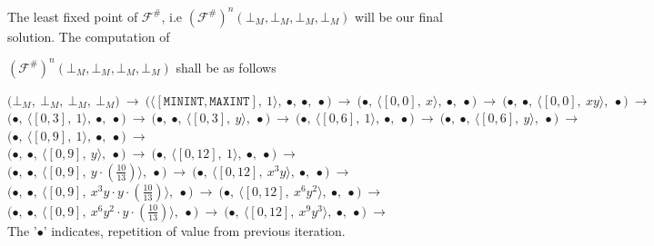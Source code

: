 \documentclass[final,3p, review, times]{util/elsarticle}
\begin{document}
The least fixed point of $\mathcal{F^\#}$, i.e $(\mathcal{F^\#})^n(\bot_M, \bot_M, \bot_M, \bot_M)$ will be our final solution. The computation of

\noindent$(\mathcal{F^\#})^n(\bot_M, \bot_M, \bot_M, \bot_M)$ shall be as follows

\noindent
$
\bigg(\bot_M,\ \bot_M,\ \bot_M,\ \bot_M\bigg)\ \to\ 
\bigg(\big\langle[\mathtt{MININT},\mathtt{MAXINT}],\ 1\big\rangle,\ \bullet,\ \bullet,\ \bullet\bigg)\ \to\ 
\bigg(\bullet,\ \big\langle[0,0],\ x\big\rangle,\ \bullet,\ \bullet\bigg)\ \to\ 
\bigg(\bullet,\ \bullet,\ \big\langle[0,0],\ xy\big\rangle,\ \bullet\bigg)\ \to
$\\
$
\bigg(\bullet,\ \big\langle[0,3],\ 1\big\rangle,\ \bullet,\ \bullet\bigg)\ \to\ 
\bigg(\bullet,\ \bullet,\ \big\langle[0,3],\ y\big\rangle,\ \bullet\bigg)\ \to\ 
\bigg(\bullet,\ \big\langle[0,6],\ 1\big\rangle,\ \bullet,\ \bullet\bigg)\ \to\ 
\bigg(\bullet,\ \bullet,\ \big\langle[0,6],\ y\big\rangle,\ \bullet\bigg)\ \to
$\\
$
\bigg(\bullet,\ \big\langle[0,9],\ 1\big\rangle,\ \bullet,\ \bullet\bigg)\ \to
$\\
$\bigg(\bullet,\ \bullet,\ \big\langle[0,9],\ y\big\rangle,\ \bullet\bigg)\ \to\ 
\bigg(\bullet,\ \big\langle[0,12],\ 1\big\rangle,\ \bullet,\ \bullet\bigg)\ \to
$\\
$
\bigg(\bullet,\ \bullet,\ \big\langle[0,9],\ y\cdot\left(\frac{10}{13}\right)\big\rangle,\ \bullet\bigg)\ \to\ 
\bigg(\bullet,\ \big\langle[0,12],\ x^3y\big\rangle,\ \bullet,\ \bullet\bigg)\ \to
$\\
$
\bigg(\bullet,\ \bullet,\ \big\langle[0,9],\ x^3y\cdot y\cdot\left(\frac{10}{13}\right)\big\rangle,\ \bullet\bigg)\ \to\ 
\bigg(\bullet,\ \big\langle[0,12],\ x^6y^2\big\rangle,\ \bullet,\ \bullet\bigg)\ \to
$\\
$
\bigg(\bullet,\ \bullet,\ \big\langle[0,9],\ x^6y^2\cdot y\cdot\left(\frac{10}{13}\right)\big\rangle,\ \bullet\bigg)\ \to\ 
\bigg(\bullet,\ \big\langle[0,12],\ x^9y^3\big\rangle,\ \bullet,\ \bullet\bigg)\ \to
$\\
    
The '$\bullet$' indicates, repetition of value from previous iteration.

 









\end{document}
